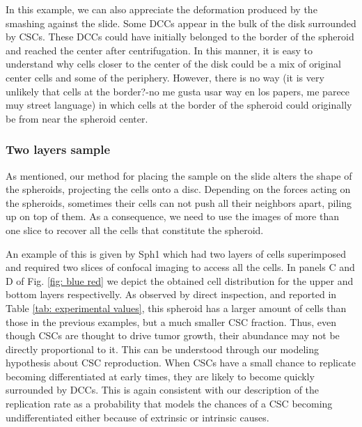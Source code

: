 \documentclass[fleqn,10pt]{wlscirep}
\begin{document}
In this example, we can also appreciate the deformation produced by the smashing against the slide. Some DCCs appear in the bulk of the disk surrounded by CSCs. These DCCs could have initially belonged to the border of the spheroid and reached the center after centrifugation. In this manner, it is easy to understand why cells closer to the center of the disk could be a mix of original center cells and some of the periphery. However, there is no way (it is very unlikely that cells at the border?-no me gusta usar way en los papers, me parece muy street language) in which cells at the border of the spheroid could originally be from near the spheroid center.







\subsubsection*{Two layers sample}

As mentioned, our method for placing the sample on the slide alters the shape of the spheroids, projecting the cells onto a disc. Depending on the forces acting on the spheroids, sometimes their cells can not push all their neighbors apart, piling up on top of them. As a consequence, we need to use the images of more than one slice to recover all the cells that constitute the spheroid. 

An example of this is given by \textsf{ Sph1} which had two layers of cells superimposed and required two slices of confocal imaging to access all the cells. In panels C and D of Fig. \ref{fig: blue red} we depict the obtained cell distribution for the upper and bottom layers respectivelly. As observed by direct inspection, and reported in Table \ref{tab: experimental values}, this spheroid has a larger amount of cells than those in the previous examples, but a much smaller CSC fraction. Thus, even though CSCs are thought to drive tumor growth, their abundance may not be directly proportional to it. This can be understood through our modeling hypothesis about CSC reproduction. When CSCs have a small chance to replicate  becoming differentiated at early times, they are likely to become quickly surrounded by DCCs. This is again consistent with our description of the replication rate as a probability that models the chances of a CSC becoming undifferentiated either because of extrinsic or intrinsic causes. 
\end{document}
